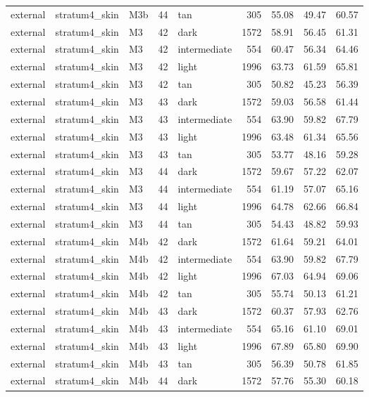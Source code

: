\begin{tabular}{lllrlrrrr}
external & stratum4\_skin & M3b & 44 & tan & 305 & 55.08 & 49.47 & 60.57 \\
external & stratum4\_skin & M3 & 42 & dark & 1572 & 58.91 & 56.45 & 61.31 \\
external & stratum4\_skin & M3 & 42 & intermediate & 554 & 60.47 & 56.34 & 64.46 \\
external & stratum4\_skin & M3 & 42 & light & 1996 & 63.73 & 61.59 & 65.81 \\
external & stratum4\_skin & M3 & 42 & tan & 305 & 50.82 & 45.23 & 56.39 \\
external & stratum4\_skin & M3 & 43 & dark & 1572 & 59.03 & 56.58 & 61.44 \\
external & stratum4\_skin & M3 & 43 & intermediate & 554 & 63.90 & 59.82 & 67.79 \\
external & stratum4\_skin & M3 & 43 & light & 1996 & 63.48 & 61.34 & 65.56 \\
external & stratum4\_skin & M3 & 43 & tan & 305 & 53.77 & 48.16 & 59.28 \\
external & stratum4\_skin & M3 & 44 & dark & 1572 & 59.67 & 57.22 & 62.07 \\
external & stratum4\_skin & M3 & 44 & intermediate & 554 & 61.19 & 57.07 & 65.16 \\
external & stratum4\_skin & M3 & 44 & light & 1996 & 64.78 & 62.66 & 66.84 \\
external & stratum4\_skin & M3 & 44 & tan & 305 & 54.43 & 48.82 & 59.93 \\
external & stratum4\_skin & M4b & 42 & dark & 1572 & 61.64 & 59.21 & 64.01 \\
external & stratum4\_skin & M4b & 42 & intermediate & 554 & 63.90 & 59.82 & 67.79 \\
external & stratum4\_skin & M4b & 42 & light & 1996 & 67.03 & 64.94 & 69.06 \\
external & stratum4\_skin & M4b & 42 & tan & 305 & 55.74 & 50.13 & 61.21 \\
external & stratum4\_skin & M4b & 43 & dark & 1572 & 60.37 & 57.93 & 62.76 \\
external & stratum4\_skin & M4b & 43 & intermediate & 554 & 65.16 & 61.10 & 69.01 \\
external & stratum4\_skin & M4b & 43 & light & 1996 & 67.89 & 65.80 & 69.90 \\
external & stratum4\_skin & M4b & 43 & tan & 305 & 56.39 & 50.78 & 61.85 \\
external & stratum4\_skin & M4b & 44 & dark & 1572 & 57.76 & 55.30 & 60.18 \\

\end{tabular}
